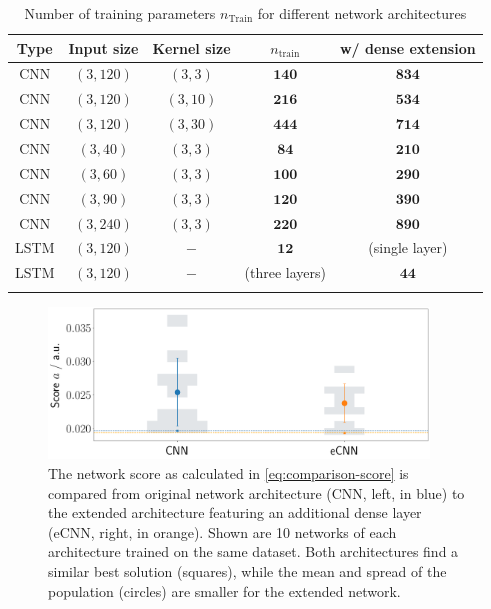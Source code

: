 \begin{table}[h]
	\begin{center}
	\caption{Number of training parameters $n_\text{Train}$ for different network architectures}
	\begin{tabular*}{0.8\textwidth}{@{\extracolsep{\fill}} ccccc}
		\toprule
		Type & Input size & Kernel size & $n_\text{train}$ & w/ dense extension \\
		\midrule
		CNN & $(3, 120)$ & $(3, 3)$ & $\mathbf{140}$ & $\mathbf{834}$ \\
		CNN & $(3, 120)$ & $(3, 10)$ & $\mathbf{216}$ & $\mathbf{534}$ \\
		CNN & $(3, 120)$ & $(3, 30)$ & $\mathbf{444}$ & $\mathbf{714}$ \\
		CNN & $(3, 40)$ & $(3, 3)$ & $\mathbf{84}$ & $\mathbf{210}$ \\
		CNN & $(3, 60)$ & $(3, 3)$ & $\mathbf{100}$ & $\mathbf{290}$ \\
		CNN & $(3, 90)$ & $(3, 3)$ & $\mathbf{120}$ & $\mathbf{390}$ \\
		CNN & $(3, 240)$ & $(3, 3)$ & $\mathbf{220}$ & $\mathbf{890}$ \\
		LSTM & $(3, 120)$ & $-$ & $\mathbf{12}$ & (single layer) \\
		LSTM & $(3, 120)$ & $-$ & (three layers) & $\mathbf{44}$ \\
		\bottomrule
	\label{tab:network-parameters}
	\end{tabular*}
	\end{center}
\end{table}

\begin{figure}
	\centering
	\includegraphics[width=0.9\textwidth]{./plots/CNN_vs_eCNN.png}
	\caption{The network score as calculated in \autoref{eq:comparison-score} is compared from original network architecture (CNN, left, in blue) to the extended
	architecture featuring an additional dense layer (eCNN, right, in orange). Shown are 10 networks of each architecture trained on the same dataset. Both
	architectures find a similar best solution (squares), while the mean and spread of the population (circles) are smaller for the extended network.}
	\label{fig:cnn-vs-ecnn}
\end{figure}

